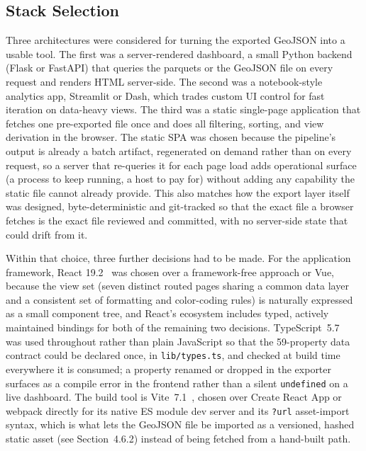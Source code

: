 \documentclass[12pt,letterpaper]{report}
\begin{document}
\subsection{Stack Selection}

Three architectures were considered for turning the exported GeoJSON into a
usable tool. The first was a server-rendered dashboard, a small Python
backend (Flask or FastAPI) that queries the parquets or the GeoJSON file on
every request and renders HTML server-side. The second was a
notebook-style analytics app, Streamlit or Dash, which trades custom UI
control for fast iteration on data-heavy views. The third was a static
single-page application that fetches one pre-exported file once and does
all filtering, sorting, and view derivation in the browser. The static SPA
was chosen because the pipeline's output is already a batch artifact,
regenerated on demand rather than on every request, so a server that
re-queries it for each page load adds operational surface (a process to
keep running, a host to pay for) without adding any capability the static
file cannot already provide. This also matches how the export layer itself
was designed, byte-deterministic and git-tracked so that the exact file a
browser fetches is the exact file reviewed and committed, with no server-side
state that could drift from it.

Within that choice, three further decisions had to be made. For the
application framework, React 19.2~\cite{react19} was chosen over a
framework-free approach or Vue, because the view set (seven distinct routed
pages sharing a common data layer and a consistent set of formatting and
color-coding rules) is naturally expressed as a small component tree, and
React's ecosystem includes typed, actively maintained bindings for both of
the remaining two decisions. TypeScript~5.7~\cite{typescript} was used
throughout rather than plain JavaScript so that the 59-property data
contract could be declared once, in \texttt{lib/types.ts}, and checked at
build time everywhere it is consumed; a property renamed or dropped in the
exporter surfaces as a compile error in the frontend rather than a silent
\texttt{undefined} on a live dashboard. The build tool is
Vite~7.1~\cite{vite7}, chosen over Create React App or webpack directly for
its native ES module dev server and its \texttt{?url} asset-import syntax,
which is what lets the GeoJSON file be imported as a versioned, hashed
static asset (see Section~4.6.2) instead of being fetched from a hand-built
path.
\end{document}
